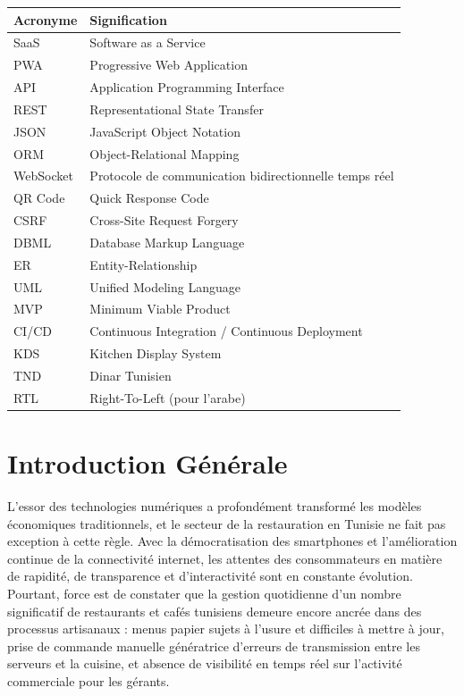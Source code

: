 \documentclass[12pt,a4paper]{report}
\begin{document}
\begin{tabularx}{\textwidth}{l X}
    \toprule
    \textbf{Acronyme} & \textbf{Signification} \\
    \midrule
    SaaS & Software as a Service \\
    PWA & Progressive Web Application \\
    API & Application Programming Interface \\
    REST & Representational State Transfer \\
    JSON & JavaScript Object Notation \\
    ORM & Object-Relational Mapping \\
    WebSocket & Protocole de communication bidirectionnelle temps r\'eel \\
    QR Code & Quick Response Code \\
    CSRF & Cross-Site Request Forgery \\
    DBML & Database Markup Language \\
    ER & Entity-Relationship \\
    UML & Unified Modeling Language \\
    MVP & Minimum Viable Product \\
    CI/CD & Continuous Integration / Continuous Deployment \\
    KDS & Kitchen Display System \\
    TND & Dinar Tunisien \\
    RTL & Right-To-Left (pour l'arabe) \\
    \bottomrule
\end{tabularx}

\cleardoublepage
\chapter*{Introduction G\'en\'erale}

L'essor des technologies numériques a profondément transformé les modèles économiques traditionnels, et le secteur de la restauration en Tunisie ne fait pas exception à cette règle. Avec la démocratisation des smartphones et l'amélioration continue de la connectivité internet, les attentes des consommateurs en matière de rapidité, de transparence et d'interactivité sont en constante évolution. Pourtant, force est de constater que la gestion quotidienne d'un nombre significatif de restaurants et cafés tunisiens demeure encore ancrée dans des processus artisanaux : menus papier sujets à l'usure et difficiles à mettre à jour, prise de commande manuelle génératrice d'erreurs de transmission entre les serveurs et la cuisine, et absence de visibilité en temps réel sur l'activité commerciale pour les gérants.
\end{document}
